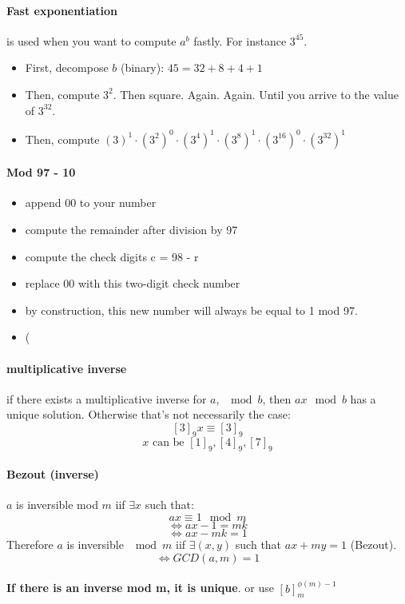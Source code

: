 \documentclass{article}
\begin{document}
\paragraph{Fast exponentiation} is used when you want to compute $ a^b $ fastly. For instance $ 3^45 $.
\begin{itemize}
    \item First, decompose $ b $ (binary): $45 = 32 + 8 + 4 + 1$
    \item Then, compute $ 3^2 $. Then square. Again. Again. Until you arrive to the value of $ 3^{32} $.
    \item Then, compute $ (3)^1 \cdot (3^2)^0 \cdot (3^4)^1 \cdot (3^8)^1 \cdot (3^{16})^0 \cdot (3^{32})^1 $
\end{itemize}

\paragraph{Mod 97 - 10}

\begin{itemize}
    \item append 00 to your number
    \item compute the remainder after division by 97
    \item compute the check digits c = 98 - r
    \item replace 00 with this two-digit check number
    \item by construction, this new number will always be equal to 1 mod 97.
    \item (
\end{itemize}

\paragraph{multiplicative inverse} if there exists a multiplicative inverse for $ a $, $ \mod b $, then $ ax \mod b $ has a unique solution. Otherwise that's not necessarily the case:
\[ [3]_9x \equiv [3]_9 \]
\[ x \text { can be } [1]_9, [4]_9, [7]_9 \]

\paragraph{Bezout (inverse)} $ a $ is inversible mod $ m $ iif $ \exists x $ such that:
\[ ax \equiv 1 \mod m \]
\[ \Leftrightarrow ax - 1 = mk \]
\[ \Leftrightarrow ax - mk = 1 \]
Therefore $ a $ is inversible $ \mod m $ iif $ \exists (x, y) $ such that $ ax + my = 1 $ (Bezout).\\
\[ \Leftrightarrow GCD(a, m) = 1 \]\\
\textbf{If there is an inverse mod m, it is unique}.
or use $ [b]_m^{\phi(m) -1} $
\end{document}
